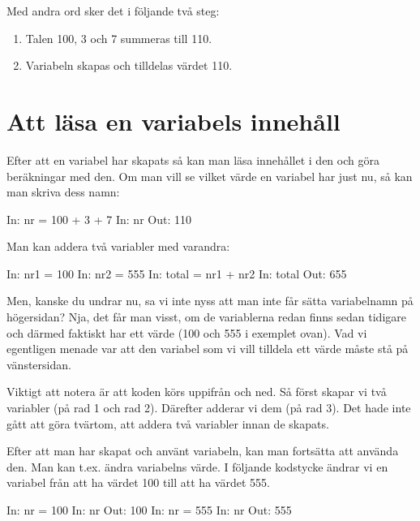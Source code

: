 Med andra ord sker det i följande två steg:
\begin{enumerate}
\item Talen 100, 3 och 7 summeras till 110.
\item Variabeln  skapas och tilldelas värdet 110.
\end{enumerate}


\section{Att läsa en variabels innehåll}
Efter att en variabel har skapats så kan man läsa innehållet i den och göra beräkningar med den. Om man vill se vilket värde en variabel har just nu, så kan man skriva dess namn:
\begin{python}[caption={Se en variabels värde},label={}]
In: nr = 100 + 3 + 7
In: nr
Out: 110
\end{python}

Man kan addera två variabler med varandra:
\begin{python}[caption={Addera två variabler},label={}]
In: nr1 = 100
In: nr2 = 555
In: total = nr1 + nr2
In: total
Out: 655
\end{python}

Men, kanske du undrar nu, sa vi inte nyss att man inte får sätta variabelnamn på högersidan? Nja, det får man visst, om de variablerna redan finns sedan tidigare och därmed faktiskt har ett värde (100 och 555 i exemplet ovan). Vad vi egentligen menade var att den variabel som vi vill tilldela ett värde måste stå på vänstersidan.

Viktigt att notera är att koden körs uppifrån och ned. Så först skapar vi två variabler (på rad 1 och rad 2). Därefter adderar vi dem (på rad 3). Det hade inte gått att göra tvärtom, att addera två variabler innan de skapats.

Efter att man har skapat och använt variabeln, kan man fortsätta att använda den. Man kan t.ex. ändra variabelns värde. I följande kodstycke ändrar vi en variabel från att ha värdet 100 till att ha värdet 555.

\begin{python}[caption={Ändra värdet på en variabel},label={}]
In: nr = 100
In: nr
Out: 100
In: nr = 555
In: nr
Out: 555
\end{python}


